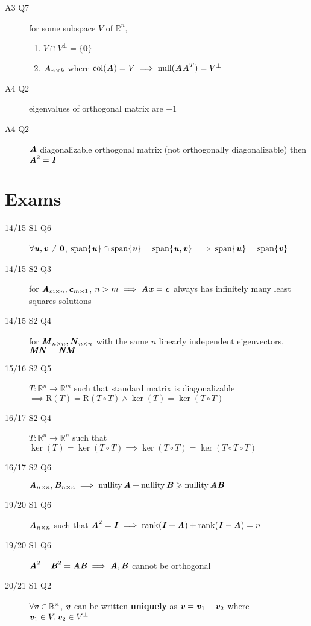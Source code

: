 \documentclass[landscape, a4paper]{article}
\let\geq\geqslant
\newcommand{\R}{\mathbb{R}}
\newcommand{\V}[1]{\textbf{\textit{#1}}}
\newcommand{\rank}{\operatorname{rank}}
\newcommand{\nullity}{\operatorname{nullity}}
\renewcommand{\and}{\wedge}
\newcommand{\Span}{\operatorname{span}}
\newcommand{\customsection}[1]{
    \vspace*{-10pt}
    \section*{#1}
}
\begin{document}
\begin{multicols*}{4}
\begin{description}
\begin{enumerate}[wide]
            \end{enumerate}
        \item[A3 Q7] for some subspace $V$ of $\R^n$,
            \begin{enumerate}[wide]
                \item $V\cap V^\perp = \{\textbf{0}\}$
                \item $\V{A}_{n\times k}$ where $\text{col}(\V{A})=V \\ \implies  \text{null}(\V{AA}^T)=V^\perp$
            \end{enumerate}
        \item[A4 Q2] eigenvalues of orthogonal matrix are $\pm 1$
        \item[A4 Q2] $\V{A}$ diagonalizable orthogonal matrix (not orthogonally diagonalizable) then $\V{A}^2=\V{I}$
    \end{description}
    \customsection{Exams}
    \begin{description}
        \item[14/15 S1 Q6] $\forall \V{u},\V{v}\neq \textbf{0}$, $\Span\{\V{u}\}\cap \Span\{\V{v}\}=\Span\{\V{u},\V{v}\}\implies \Span\{\V{u}\}=\Span\{\V{v}\}$
        \item[14/15 S2 Q3] for $\V{A}_{m\times n}, \V{c}_{m\times 1}$, $n>m\implies \V{Ax}=\V{c}$ always has infinitely many least squares solutions
        \item[14/15 S2 Q4] for $\V{M}_{n\times n}, \V{N}_{n\times n}$ with the same $n$ linearly independent eigenvectors, $\V{MN}=\V{NM}$
        \item[15/16 S2 Q5] $T:\R^n \rightarrow \R^m$ such that standard matrix is diagonalizable $\implies \text{R}(T)=\text{R}(T\circ T)\and \ker(T)=\ker(T\circ T)$
        \item[16/17 S2 Q4] $T:\R^n\rightarrow \R^n$ such that $\ker(T)=\ker(T\circ T)\implies \ker(T\circ T) = \ker(T\circ T\circ T)$
        \item[16/17 S2 Q6] $\V{A}_{n\times n}, \V{B}_{n\times n}
                \\ \implies \nullity\V{A}+\nullity\V{B}\geq \nullity\V{AB}$
        \item[19/20 S1 Q6] $\V{A}_{n\times n}$ such that $\V{A}^2=\V{I}\implies \rank(\V{I} + \V{A})+\rank(\V{I}-\V{A})=n$
        \item[19/20 S1 Q6] $\V{A}^2-\V{B}^2=\V{AB}\implies \V{A}, \V{B}$ cannot be orthogonal
        \item[20/21 S1 Q2] $\forall \V{v}\in\R^n$, $\V{v}$ can be written \textbf{uniquely} as $\V{v}=\V{v}_1 + \V{v}_2$ where $\V{v}_1\in V, \V{v}_2\in V^\perp$

\end{description}
\end{multicols*}
\end{document}
